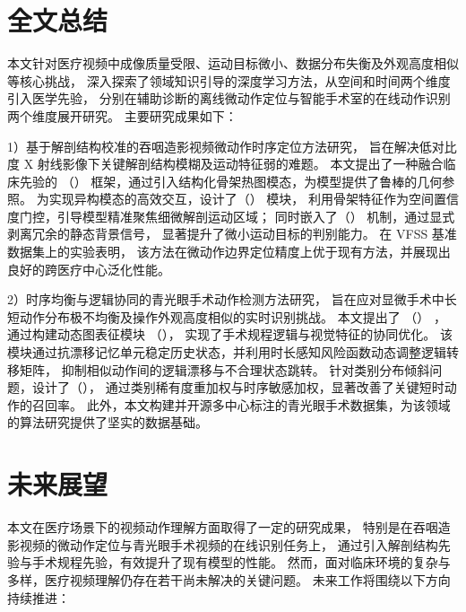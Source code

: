 
\section*{全文总结}
本文针对医疗视频中成像质量受限、运动目标微小、数据分布失衡及外观高度相似等核心挑战，
深入探索了领域知识引导的深度学习方法，从空间和时间两个维度引入医学先验，
分别在辅助诊断的离线微动作定位与智能手术室的在线动作识别两个维度展开研究。
主要研究成果如下：

1）基于解剖结构校准的吞咽造影视频微动作时序定位方法研究，
旨在解决低对比度 X 射线影像下关键解剖结构模糊及运动特征弱的难题。
本文提出了一种融合临床先验的 \fullname （\sexyname） 框架，通过引入结构化骨架热图模态，为模型提供了鲁棒的几何参照。
为实现异构模态的高效交互，设计了\crossblockfull （\crossblockshort） 模块，
利用骨架特征作为空间置信度门控，引导模型精准聚焦细微解剖运动区域；
同时嵌入了\channelblockfull （\channelblockshort） 机制，通过显式剥离冗余的静态背景信号，
显著提升了微小运动目标的判别能力。
在 VFSS 基准数据集上的实验表明，
该方法在微动作边界定位精度上优于现有方法，并展现出良好的跨医疗中心泛化性能。

2）时序均衡与逻辑协同的青光眼手术动作检测方法研究，
旨在应对显微手术中长短动作分布极不均衡及操作外观高度相似的实时识别挑战。
本文提出了 \fulltwo （\sexytwo） ，
通过构建动态图表征模块 \graphmodulefull （\graphmoduleshort），
实现了手术规程逻辑与视觉特征的协同优化。
该模块通过抗漂移记忆单元稳定历史状态，并利用时长感知风险函数动态调整逻辑转移矩阵，
抑制相似动作间的逻辑漂移与不合理状态跳转。
针对类别分布倾斜问题，设计了\lossfull （\lossshort），
通过类别稀有度重加权与时序敏感加权，显著改善了关键短时动作的召回率。
此外，本文构建并开源多中心标注的青光眼手术数据集，为该领域的算法研究提供了坚实的数据基础。

\section*{未来展望}
本文在医疗场景下的视频动作理解方面取得了一定的研究成果，
特别是在吞咽造影视频的微动作定位与青光眼手术视频的在线识别任务上，
通过引入解剖结构先验与手术规程先验，有效提升了现有模型的性能。
然而，面对临床环境的复杂与多样，医疗视频理解仍存在若干尚未解决的关键问题。
未来工作将围绕以下方向持续推进：


